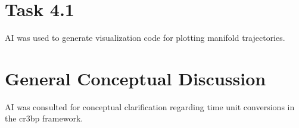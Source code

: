 

\section{Task 4.1}

AI was used to generate visualization code for plotting manifold trajectories.



\section{General Conceptual Discussion}

AI was consulted for conceptual clarification regarding time unit conversions in the \ac{cr3bp} framework.



